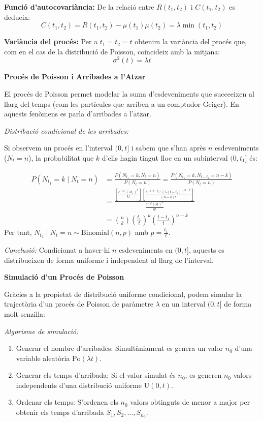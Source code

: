 \documentclass[
  catalan,
]{article}
\providecommand{\tightlist}{%
  \setlength{\itemsep}{0pt}\setlength{\parskip}{0pt}}
\theoremstyle{definition}
\theoremstyle{definition}
\theoremstyle{definition}
\theoremstyle{definition}
\theoremstyle{remark}
\begin{document}
\textbf{Funció d'autocovariància:}
De la relació entre \(R(t_1, t_2)\) i \(C(t_1, t_2)\) es dedueix:
\[C(t_1, t_2) = R(t_1, t_2) - \mu(t_1)\mu(t_2) = \lambda \min(t_1, t_2)\]

\textbf{Variància del procés:}
Per a \(t_1 = t_2 = t\) obtenim la variància del procés que, com en el cas de la distribució de Poisson, coincideix amb la mitjana:
\[\sigma^2(t) = \lambda t\]

\textbf{Procés de Poisson i Arribades a l'Atzar}

El procés de Poisson permet modelar la suma d'esdeveniments que succeeixen al llarg del temps (com les partícules que arriben a un comptador Geiger). En aquests fenòmens es parla d'arribades a l'atzar.

\emph{Distribució condicional de les arribades:}

Si observem un procés en l'interval \((0, t]\) i sabem que s'han après \(n\) esdeveniments (\(N_t = n\)), la probabilitat que \(k\) d'ells hagin tingut lloc en un subinterval \((0, t_1]\) és:

\begin{align*}
P(N_{t_1} = k \mid N_t = n) &= \frac{P(N_{t_1} = k, N_t = n)}{P(N_t = n)} = \frac{P(N_{t_1} = k, N_{t - t_1} = n - k)}{P(N_t = n)} \\[0.3em]
&= \frac{\left[ \frac{e^{-\lambda t_1} (\lambda t_1)^k}{k!} \right] \left[ \frac{e^{-\lambda (t - t_1)} (\lambda (t - t_1))^{n - k}}{(n - k)!} \right]}{\frac{e^{-\lambda t} (\lambda t)^n}{n!}} \\[0.3em]
&= \binom{n}{k} \left( \frac{t_1}{t} \right)^k \left( \frac{t - t_1}{t} \right)^{n - k}
\end{align*}
Per tant, \(N_{t_1} \mid N_t = n \sim \text{Binomial}(n, p)\) amb \(p = \frac{t_1}{t}\).

\emph{Conclusió:} Condicionat a haver-hi \(n\) esdeveniments en \((0, t]\), aquests es distribueixen de forma uniforme i independent al llarg de l'interval.

\textbf{Simulació d'un Procés de Poisson}

Gràcies a la propietat de distribució uniforme condicional, podem simular la trajectòria d'un procés de Poisson de paràmetre \(\lambda\) en un interval \((0, t]\) de forma molt senzilla:

\emph{Algorisme de simulació:}

\begin{enumerate}
\def\labelenumi{\arabic{enumi}.}
\tightlist
\item
  Generar el nombre d'arribades: Simultàniament es genera un valor \(n_0\) d'una variable aleatòria \(\text{Po}(\lambda t)\).
\item
  Generar els temps d'arribada: Si el valor simulat és \(n_0\), es generen \(n_0\) valors independents d'una distribució uniforme \(\text{U}(0, t)\).
\item
  Ordenar els temps: S'ordenen els \(n_0\) valors obtinguts de menor a major per obtenir els temps d'arribada \(S_1, S_2, \dots, S_{n_0}\).
\end{enumerate}
\end{document}
